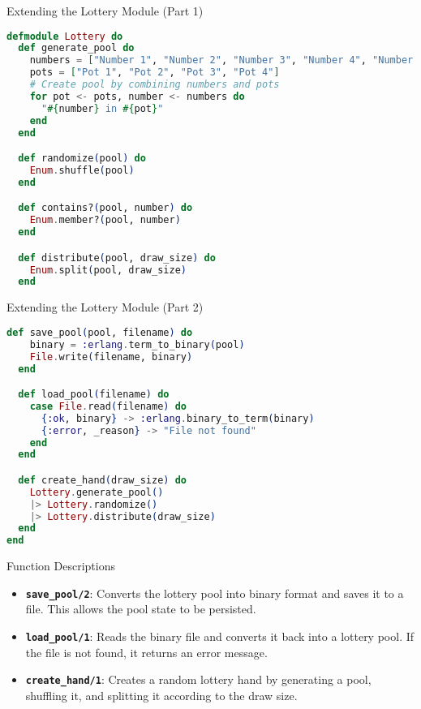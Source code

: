 \documentclass[aspectratio=169, table]{beamer}
\begin{document}
\begin{frame}[fragile]{Extending the Lottery Module (Part 1)}
\vspace{20pt}
\begin{lstlisting}[language=Elixir, basicstyle=\ttfamily\scriptsize]
defmodule Lottery do
  def generate_pool do
    numbers = ["Number 1", "Number 2", "Number 3", "Number 4", "Number 5"]
    pots = ["Pot 1", "Pot 2", "Pot 3", "Pot 4"]
    # Create pool by combining numbers and pots
    for pot <- pots, number <- numbers do
      "#{number} in #{pot}"
    end
  end

  def randomize(pool) do
    Enum.shuffle(pool)
  end

  def contains?(pool, number) do
    Enum.member?(pool, number)
  end

  def distribute(pool, draw_size) do
    Enum.split(pool, draw_size)
  end
\end{lstlisting}
\end{frame}


\begin{frame}[fragile]{Extending the Lottery Module (Part 2)}
\vspace{20pt}
\begin{lstlisting}[language=Elixir, basicstyle=\ttfamily\scriptsize]
  def save_pool(pool, filename) do
    binary = :erlang.term_to_binary(pool)
    File.write(filename, binary)
  end

  def load_pool(filename) do
    case File.read(filename) do
      {:ok, binary} -> :erlang.binary_to_term(binary)
      {:error, _reason} -> "File not found"
    end
  end

  def create_hand(draw_size) do
    Lottery.generate_pool()
    |> Lottery.randomize()
    |> Lottery.distribute(draw_size)
  end
end
\end{lstlisting}
\end{frame}


\begin{frame}{Function Descriptions}
\vspace{20pt}
\begin{itemize}
  \item \textbf{\texttt{save\_pool/2}}: Converts the lottery pool into binary format and saves it to a file. This allows the pool state to be persisted.
  \item \textbf{\texttt{load\_pool/1}}: Reads the binary file and converts it back into a lottery pool. If the file is not found, it returns an error message.
  \item \textbf{\texttt{create\_hand/1}}: Creates a random lottery hand by generating a pool, shuffling it, and splitting it according to the draw size.
\end{itemize}
\end{frame}
\end{document}
